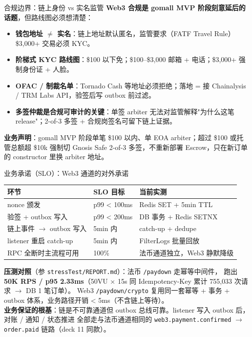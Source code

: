 \documentclass[aspectratio=169,11pt]{beamer}
\begin{document}
\begin{frame}[shrink]{合规边界：链上身份 vs 实名监管}
\textbf{Web3 合规是 gomall MVP 阶段刻意延后的话题}，但路线图必须想清楚：
\begin{itemize}
  \item \textbf{钱包地址 $\neq$ 实名}：链上地址默认匿名，监管要求（FATF Travel Rule）\$3{,}000+ 交易必须 KYC。
  \item \textbf{阶梯式 KYC 路线图}：\$100 以下免；\$100--\$3{,}000 邮箱 + 电话；\$3{,}000+ 强制身份证 + 人脸。
  \item \textbf{OFAC / 制裁名单}：Tornado Cash 等地址必须拒绝；落地 = 接 Chainalysis / TRM Labs API，验签后写 outbox 前过滤。
  \item \textbf{多签仲裁是合规可审计的关键}：单签 arbiter 无法对监管解释"为什么这笔 release"；2-of-3 多签 + 合规岗签名可留下链上证据。
\end{itemize}
\vspace{1mm}
\small \textbf{业务声明}：gomall MVP 阶段单笔 \$100 以内、单 EOA arbiter；超过 \$100 或托管总额超 \$10k
强制切 Gnosis Safe 2-of-3 多签，不重新部署 Escrow，只在新订单的 constructor 里换 arbiter 地址。
\end{frame}

\begin{frame}[shrink]{业务承诺（SLO）：Web3 通道的对外承诺}
\begin{tabular}{@{}lll@{}}
\toprule
环节 & SLO 目标 & 当前实测 \\
\midrule
nonce 颁发 & p99 < 100ms & Redis SET + 5min TTL \\
验签 + outbox 写入 & p99 < 200ms & DB 事务 + Redis SETNX \\
链上事件 $\to$ outbox 写入 & 5min 内 & catch-up + dedupe \\
listener 重启 catch-up & 5min 内 & FilterLogs 批量回放 \\
RPC 全断时主流程可用 & 100\% & 法币通道独立，Web3 静默降级 \\
\bottomrule
\end{tabular}
\vspace{2mm}
\small \textbf{压测对照}（参 \texttt{stressTest/REPORT.md}）：法币 \texttt{/paydown} 走幂等中间件，
跑出 \textbf{50K RPS / p95 2.33ms}（50VU × 15s 同 Idempotency-Key 累计 755{,}033 次请求 $\to$ DB 1 笔订单）。
Web3 \texttt{/paydown/crypto} 复用同一套幂等 + 事务 + outbox 体系，业务路径开销 < 5ms（不含链上等待）。\\
\textbf{业务保证的根基}：链是不可靠通道但 outbox 总线可靠。listener 写入 outbox 后，对账 / 通知 / 状态推进
全部走与法币通道相同的 \texttt{web3.payment.confirmed} $\to$ \texttt{order.paid} 链路（deck 11 同款）。
\end{frame}
\end{document}
